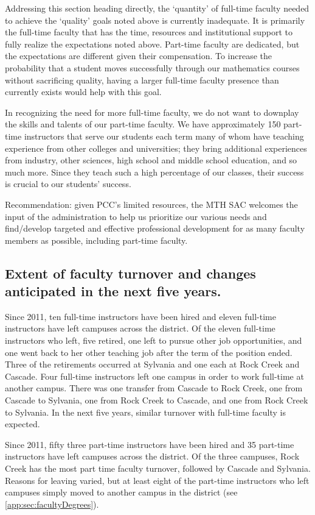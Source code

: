 Addressing this section heading directly, the `quantity' of full-time faculty needed to achieve the `quality' goals noted above is currently inadequate.  It is primarily the full-time faculty that has the time, resources and institutional support to fully realize the expectations noted above.  Part-time faculty are dedicated, but the expectations are different given their compensation.   To increase the probability that a student moves successfully through our mathematics courses without sacrificing quality, having a larger full-time faculty presence than currently exists would help with this goal.

In recognizing the need for more full-time faculty, we do not want to downplay the skills and talents of our part-time faculty.  We have approximately 150 part-time instructors that serve our students each term many of whom have teaching experience from other colleges and universities; they bring additional experiences from industry, other sciences, high school and middle school education, and so much more.  Since they teach such a high percentage of our classes, their success is crucial to our students' success.

Recommendation:  given PCC's limited resources, the MTH SAC welcomes the input of the administration to help us prioritize our various needs and find/develop targeted and effective professional development for as many faculty members as possible, including part-time faculty.  

\subsection{Extent of faculty turnover and changes anticipated in the next five years.} 
Since 2011, ten full-time instructors have been hired and eleven full-time instructors have left campuses across the district.  Of the eleven full-time instructors who left, five retired, one left to pursue other job opportunities, and one went back to her other teaching job after the term of the position ended.  Three of the retirements occurred at Sylvania and one each at Rock Creek and Cascade.  Four full-time instructors left one campus in order to work full-time at another campus.   There was one transfer from Cascade to Rock Creek, one from Cascade to Sylvania, one from Rock Creek to Cascade, and one from Rock Creek to Sylvania.  In the next five years, similar turnover with full-time faculty is expected.

Since 2011, fifty three part-time instructors have been hired and 35 part-time instructors have left campuses across the district.  Of the three campuses, Rock Creek has the most part time faculty turnover, followed by Cascade and Sylvania.  Reasons for leaving varied, but at least eight of the part-time instructors who left campuses simply moved to another campus in the district (see \vref{app:sec:facultyDegrees}).

